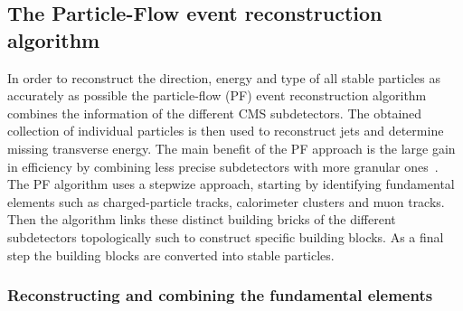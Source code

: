 \subsection{The Particle-Flow event reconstruction algorithm} \label{subsec::PF}

In order to reconstruct the direction, energy and type of all stable particles as accurately as possible the particle-flow (PF) event reconstruction algorithm combines the information of the different CMS subdetectors. The obtained collection of individual particles is then used to reconstruct jets and determine missing transverse energy.
The main benefit of the PF approach is the large gain in efficiency by combining less precise subdetectors with more granular ones~\cite{}.
\\
The PF algorithm uses a stepwize approach, starting by identifying fundamental elements such as charged-particle tracks, calorimeter clusters and muon tracks. Then the algorithm links these distinct building bricks of the different subdetectors topologically such to construct specific building blocks. As a final step the building blocks are converted into stable particles.

\subsubsection*{Reconstructing and combining the fundamental elements}

